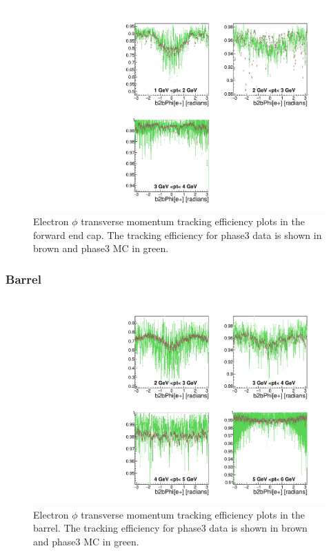 \documentclass[a4paper,11pt,twosided,final,german,openbib,pdftex,listof=totoc,bibliography=totoc]{scrbook}
\begin{document}
\begin{figure}[!htbp]
	\centering
	\includegraphics[width=\textwidth]{Plots/master3/xPtMPhiemFCP3}
	\caption[Transverse Momentum $\phi$ Electron Forward End Cap Efficiency Phase3]{Electron $\phi$ transverse momentum tracking efficiency plots in the forward end cap. The tracking efficiency for phase3 data is shown in brown and phase3 MC in green.}
	\label{plt:xPtMPhiemFC3}
\end{figure}



\newpage
\subsubsection{Barrel}



\begin{figure}[!htbp]
	\centering
	\includegraphics[width=\textwidth]{Plots/master3/xPtMPhiemBarrelP3}
	\caption[Transverse Momentum $\phi$ Electron Barrel Efficiency Phase3]{Electron $\phi$ transverse momentum tracking efficiency plots in the barrel. The tracking efficiency for phase3 data is shown in brown and phase3 MC in green.}
	\label{plt:xPtMPhiemBarrel3}
\end{figure}
\end{document}
